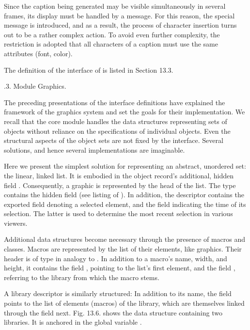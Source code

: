 Since the caption being generated may be visible simultaneously in several frames, its display must be handled by a message. For this reason, the special message  is introduced, and as a result, the process of character insertion turns out to be a rather complex action. To avoid even further complexity, the restriction is adopted that all characters of a caption must use the same attributes (font, color).

The definition of the interface of  is listed in Section 13.3.

.3. Module Graphics.

The preceding presentations of the interface definitions have explained the framework of the graphics system and set the goals for their implementation. We recall that the core module  handles the data structures representing sets of objects without reliance on the specifications of individual objects. Even the structural aspects of the object sets are not fixed by the interface. Several solutions, and hence several implementations are imaginable.

Here we present the simplest solution for representing an abstract, unordered set: the linear, linked list. It is embodied in the object record's additional, hidden field . Consequently, a graphic is represented by the head of the list. The type  contains the hidden field  (see listing of ). In addition, the descriptor contains the exported field  denoting a selected element, and the field  indicating the time of its selection. The latter is used to determine the most recent selection in various viewers.

Additional data structures become necessary through the presence of macros and classes. Macros are represented by the list of their elements, like graphics. Their header is of type  in analogy to . In addition to a macro's name, width, and height, it contains the field , pointing to the list's first element, and the field , referring to the library from which the macro stems.

A library descriptor is similarly structured: In addition to its name, the field  points to the list of elements (macros) of the library, which are themselves linked through the field next. Fig. 13.6. shows the data structure containing two libraries. It is anchored in the global variable .


